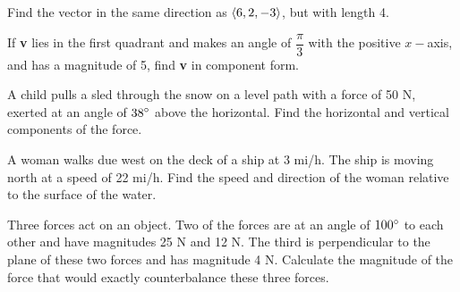 \documentclass[notes]{subfiles}
\begin{document}
		\begin{ex}
			Find the vector in the same direction as $\left\langle 6,2,-3\right\rangle$, but with length 4.
		\end{ex}
			
		\begin{ex}
			If \textbf{v} lies in the first quadrant and makes an angle of $\dfrac{\pi}{3}$ with the positive $x-$axis, and has a magnitude of 5, find \textbf{v} in component form.
		\end{ex}
			
		\begin{ex}
			A child pulls a sled through the snow on a level path with a force of 50 N, exerted at an angle of $38^\circ$ above the horizontal.  Find the horizontal and vertical components of the force.
		\end{ex}
			\newpage
			
		\begin{ex}
			A woman walks due west on the deck of a ship at 3 mi/h.  The ship is moving north at a speed of 22 mi/h.  Find the speed and direction of the woman relative to the surface of the water.
		\end{ex}
			
		\begin{ex}
			Three forces act on an object.  Two of the forces are at an angle of $100^\circ$ to each other and have magnitudes 25 N and 12 N. The third is perpendicular to the plane of these two forces and has magnitude 4 N.  Calculate the magnitude of the force that would exactly counterbalance these three forces.
		\end{ex}
		
			
\clearpage
\end{document}
